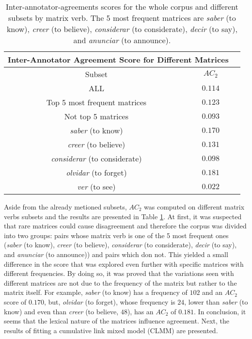 \begin{table}
\center
\begin{tabular}{|c|c|c|}
\hline
\multicolumn{2}{|c|}{Inter-Annotator Agreement Score for Different Matrices}\\\hline
                     Subset & $AC_2$\\\hline 
ALL & $0.114$\\\hline 
Top 5 most frequent matrices & $0.123$\\\hline
Not top 5 matrices & $0.093$\\\hline
\textit{saber} (to know) & $0.170$\\\hline
\textit{creer} (to believe) & $0.131$\\\hline
\textit{considerar} (to considerate) & $0.098$\\\hline
\textit{olvidar} (to forget) & $0.181$\\\hline
\textit{ver} (to see) & $0.022$\\\hline
\end{tabular}
\caption[AC2 matrices.]{Inter-annotator-agreements scores for the whole corpus and different subsets by matrix verb. The 5 most frequent matrices are \textit{saber} (to know), \textit{creer} (to believe), \textit{considerar} (to considerate), \textit{decir} (to say), and \textit{anunciar} (to announce).}
\label{tab:iaamatrix}
\end{table}

Aside from the already metioned subsets, $AC_2$ was computed on different matrix verbs subsets and the results are presented in Table \ref{tab:iaamatrix}. At first, it was suspected that rare matrices could cause disagreement and therefore the corpus was divided into two groups: pairs whose matrix verb is one of the 5 most frequent ones (\textit{saber} (to know), \textit{creer} (to believe), \textit{considerar} (to considerate), \textit{decir} (to say), and \textit{anunciar} (to announce)) and pairs which don not. This yielded a small difference in the score that was explored even further with specific matrices with different frequencies. By doing so, it was proved that the variations seen with different matrices are not due to the frequency of the matrix but rather to the matrix itself. For example, \textit{saber} (to know) has a frequency of $102$ and an $AC_2$ score of $0.170$, but, \textit{olvidar} (to forget), whose frequency is $24$, lower than \textit{saber} (to know) and even than \textit{creer} (to believe, $48$), has an $AC_2$ of $0.181$. In conclusion, it seems that the lexical nature of the matrices influence agreement. Next, the results of fitting a cumulative link mixed model (CLMM) are presented.\\

